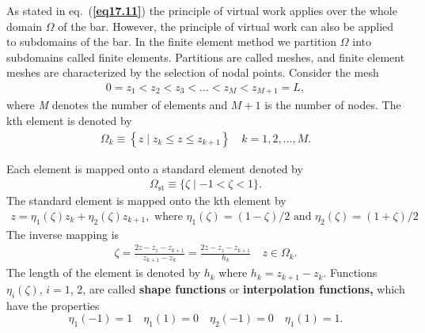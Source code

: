 \documentclass{AeroStructure-ERJohnson}
\begin{document}
As stated in eq.~(\textbf{\ref{eq17.11}}) the principle of virtual work applies over the whole domain $\Omega$ of the bar. However, the principle of virtual work can also be applied to subdomains of the bar. In the finite element method we partition $\Omega$ into subdomains called finite elements. Partitions are called meshes, and finite element meshes are characterized by the selection of nodal points. Consider the mesh
\begin{align}\label{eq17.13}
0=z_{1}<z_{2}<z_{3}<\ldots<z_{M}<z_{M+1}=L,
\end{align}
where \textit{M} denotes the number of elements and $M+1$ is the number of nodes. The kth element is denoted by
\begin{align}\label{eq17.14}
\Omega_{k} \equiv\left\{z \mid z_{k} \leq z \leq z_{k+1}\right\} \quad k=1,2, \ldots, M.
\end{align}

\vspace*{-1pc}\pagebreak

\noindent Each element is mapped onto a standard element denoted by
\begin{align}\label{eq17.15}
\Omega_{\mathrm{st}} \equiv\{\zeta \mid-1<\zeta<1\}.
\end{align}
The standard element is mapped onto the kth element by
\begin{align}\label{eq17.16}
z=\eta_{1}(\zeta) z_{k}+\eta_{2}(\zeta) z_{k+1}, \textrm{ where } \eta_{1}(\zeta)=(1-\zeta)/2 \textrm{ and } \eta_{2}(\zeta)=(1+\zeta)/2
\end{align}
The inverse mapping is
\begin{align}\label{eq17.17}
\zeta=\frac{2 z-z_{z}-z_{k+1}}{z_{k+1}-z_{k}}=\frac{2 z-z_{z}-z_{k+1}}{h_{k}} \quad z \in \Omega_{k}.
\end{align}
The length of the element is denoted by $h_{k}$ where $h_{k}=z_{k+1}-z_{k}$. Functions $\eta_{i}(\zeta)$, $i=1$, 2, are called \textbf{shape functions} or \textbf{interpolation functions,} which have the properties
\begin{equation}
\eta_{1}(-1)=1 \quad \eta_{1}(1)=0 \quad \eta_{2}(-1)=0 \quad \eta_{1}(1)=1. \label{eq17.18}
\end{equation}

\vspace*{-1pc}
\end{document}
